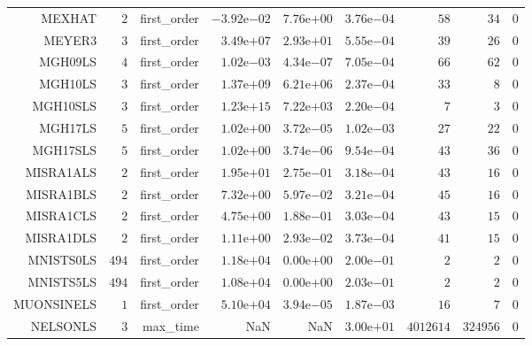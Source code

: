 \begin{longtable}{rrrrrrrrr}
MEXHAT & \(     2\) & first\_order & \(-3.92\)e\(-02\) & \( 7.76\)e\(+00\) & \( 3.76\)e\(-04\) & \(    58\) & \(    34\) & \(     0\) \\
MEYER3 & \(     3\) & first\_order & \( 3.49\)e\(+07\) & \( 2.93\)e\(+01\) & \( 5.55\)e\(-04\) & \(    39\) & \(    26\) & \(     0\) \\
MGH09LS & \(     4\) & first\_order & \( 1.02\)e\(-03\) & \( 4.34\)e\(-07\) & \( 7.05\)e\(-04\) & \(    66\) & \(    62\) & \(     0\) \\
MGH10LS & \(     3\) & first\_order & \( 1.37\)e\(+09\) & \( 6.21\)e\(+06\) & \( 2.37\)e\(-04\) & \(    33\) & \(     8\) & \(     0\) \\
MGH10SLS & \(     3\) & first\_order & \( 1.23\)e\(+15\) & \( 7.22\)e\(+03\) & \( 2.20\)e\(-04\) & \(     7\) & \(     3\) & \(     0\) \\
MGH17LS & \(     5\) & first\_order & \( 1.02\)e\(+00\) & \( 3.72\)e\(-05\) & \( 1.02\)e\(-03\) & \(    27\) & \(    22\) & \(     0\) \\
MGH17SLS & \(     5\) & first\_order & \( 1.02\)e\(+00\) & \( 3.74\)e\(-06\) & \( 9.54\)e\(-04\) & \(    43\) & \(    36\) & \(     0\) \\
MISRA1ALS & \(     2\) & first\_order & \( 1.95\)e\(+01\) & \( 2.75\)e\(-01\) & \( 3.18\)e\(-04\) & \(    43\) & \(    16\) & \(     0\) \\
MISRA1BLS & \(     2\) & first\_order & \( 7.32\)e\(+00\) & \( 5.97\)e\(-02\) & \( 3.21\)e\(-04\) & \(    45\) & \(    16\) & \(     0\) \\
MISRA1CLS & \(     2\) & first\_order & \( 4.75\)e\(+00\) & \( 1.88\)e\(-01\) & \( 3.03\)e\(-04\) & \(    43\) & \(    15\) & \(     0\) \\
MISRA1DLS & \(     2\) & first\_order & \( 1.11\)e\(+00\) & \( 2.93\)e\(-02\) & \( 3.73\)e\(-04\) & \(    41\) & \(    15\) & \(     0\) \\
MNISTS0LS & \(   494\) & first\_order & \( 1.18\)e\(+04\) & \( 0.00\)e\(+00\) & \( 2.00\)e\(-01\) & \(     2\) & \(     2\) & \(     0\) \\
MNISTS5LS & \(   494\) & first\_order & \( 1.08\)e\(+04\) & \( 0.00\)e\(+00\) & \( 2.03\)e\(-01\) & \(     2\) & \(     2\) & \(     0\) \\
MUONSINELS & \(     1\) & first\_order & \( 5.10\)e\(+04\) & \( 3.94\)e\(-05\) & \( 1.87\)e\(-03\) & \(    16\) & \(     7\) & \(     0\) \\
NELSONLS & \(     3\) & max\_time &       NaN &       NaN & \( 3.00\)e\(+01\) & \(4012614\) & \(324956\) & \(     0\) \\

\end{longtable}

